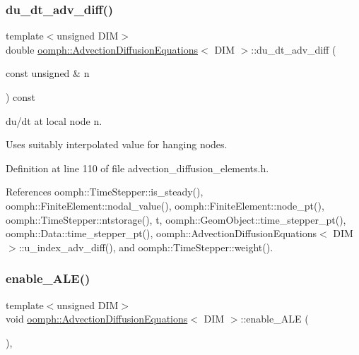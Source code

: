 \subsubsection{\texorpdfstring{du\+\_\+dt\+\_\+adv\+\_\+diff()}{du\_dt\_adv\_diff()}}
{\footnotesize\ttfamily template$<$unsigned D\+IM$>$ \\
double \hyperlink{classoomph_1_1AdvectionDiffusionEquations}{oomph\+::\+Advection\+Diffusion\+Equations}$<$ D\+IM $>$\+::du\+\_\+dt\+\_\+adv\+\_\+diff (\begin{DoxyParamCaption}\item[{const unsigned \&}]{n }\end{DoxyParamCaption}) const\hspace{0.3cm}{\ttfamily [inline]}}



du/dt at local node n. 

Uses suitably interpolated value for hanging nodes. 

Definition at line 110 of file advection\+\_\+diffusion\+\_\+elements.\+h.



References oomph\+::\+Time\+Stepper\+::is\+\_\+steady(), oomph\+::\+Finite\+Element\+::nodal\+\_\+value(), oomph\+::\+Finite\+Element\+::node\+\_\+pt(), oomph\+::\+Time\+Stepper\+::ntstorage(), t, oomph\+::\+Geom\+Object\+::time\+\_\+stepper\+\_\+pt(), oomph\+::\+Data\+::time\+\_\+stepper\+\_\+pt(), oomph\+::\+Advection\+Diffusion\+Equations$<$ D\+I\+M $>$\+::u\+\_\+index\+\_\+adv\+\_\+diff(), and oomph\+::\+Time\+Stepper\+::weight().

\mbox{\label{classoomph_1_1AdvectionDiffusionEquations_a949dd5a3eb9803c993c1f4506cfd5d82}} 
\subsubsection{\texorpdfstring{enable\+\_\+\+A\+L\+E()}{enable\_ALE()}}
{\footnotesize\ttfamily template$<$unsigned D\+IM$>$ \\
void \hyperlink{classoomph_1_1AdvectionDiffusionEquations}{oomph\+::\+Advection\+Diffusion\+Equations}$<$ D\+IM $>$\+::enable\+\_\+\+A\+LE (\begin{DoxyParamCaption}{ }\end{DoxyParamCaption})\hspace{0.3cm}{\ttfamily [inline]}, {\ttfamily [virtual]}}



